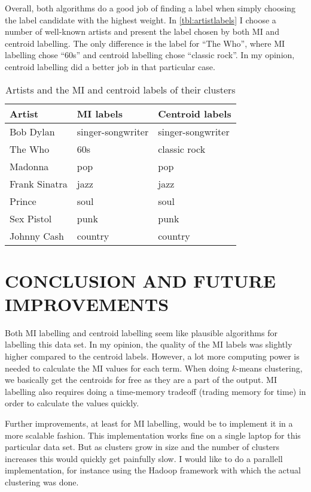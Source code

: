 \documentclass[letterpaper, 10 pt, conference]{ieeeconf}
\begin{document}
Overall, both algorithms do a good job of finding a label when simply choosing
the label candidate with the highest weight. In \autoref{tbl:artistlabels} I
choose a number of well-known artists and present the label chosen by both MI
and centroid labelling. The only difference is the label for ``The Who'', where
MI labelling chose ``60s'' and centroid labelling chose ``classic rock''. In my
opinion, centroid labelling did a better job in that particular case.

\begin{table}
\centering
 \begin{tabular}{ |l|l|l| }
  \hline
   Artist & MI labels & Centroid labels \\
  \hline
   Bob Dylan & singer-songwriter & singer-songwriter \\
  \hline
   The Who & 60s & classic rock \\
  \hline
   Madonna & pop & pop \\
  \hline
   Frank Sinatra & jazz & jazz \\
  \hline
   Prince & soul & soul \\
  \hline
   Sex Pistol & punk & punk \\
  \hline
   Johnny Cash & country & country \\
  \hline
 \end{tabular}
 \caption{Artists and the MI and centroid labels of their clusters}
 \label{tbl:artistlabels}
\end{table}

\section{CONCLUSION AND FUTURE IMPROVEMENTS}
Both MI labelling and centroid labelling seem like plausible algorithms for
labelling this data set. In my opinion, the quality of the MI labels was
slightly higher compared to the centroid labels. However, a lot more computing
power is needed to calculate the MI values for each term. When doing $k$-means
clustering, we basically get the centroids for free as they are a part of the
output. MI labelling also requires doing a time-memory tradeoff (trading memory
for time) in order to calculate the values quickly.

Further improvements, at least for MI labelling, would be to implement it in a
more scalable fashion. This implementation works fine on a single laptop for
this particular data set. But as clusters grow in size and the number of
clusters increases this would quickly get painfully slow. I would like to do a
parallell implementation, for instance using the Hadoop framework with which the
actual clustering was done.
\end{document}
